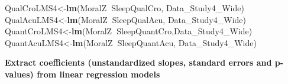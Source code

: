 \documentclass[
]{book}
\newenvironment{Shaded}{\begin{snugshade}}{\end{snugshade}}
\newcommand{\DataTypeTok}[1]{\textcolor[rgb]{0.13,0.29,0.53}{#1}}
\newcommand{\KeywordTok}[1]{\textcolor[rgb]{0.13,0.29,0.53}{\textbf{#1}}}
\newcommand{\NormalTok}[1]{#1}
\newcommand{\OperatorTok}[1]{\textcolor[rgb]{0.81,0.36,0.00}{\textbf{#1}}}
\newcommand{\OtherTok}[1]{\textcolor[rgb]{0.56,0.35,0.01}{#1}}
\newcommand{\StringTok}[1]{\textcolor[rgb]{0.31,0.60,0.02}{#1}}
\begin{document}
\begin{Shaded}
\end{Shaded}

\begin{Shaded}
\begin{Highlighting}[]
\NormalTok{QualCroLMS4<-}\KeywordTok{lm}\NormalTok{(MoralZ}\OperatorTok{~}\NormalTok{SleepQualCro, Data_Study4_Wide)}
\NormalTok{QualAcuLMS4<-}\KeywordTok{lm}\NormalTok{(MoralZ}\OperatorTok{~}\NormalTok{SleepQualAcu, Data_Study4_Wide)}
\NormalTok{QuantCroLMS4<-}\KeywordTok{lm}\NormalTok{(MoralZ}\OperatorTok{~}\NormalTok{SleepQuantCro,Data_Study4_Wide)}
\NormalTok{QuantAcuLMS4<-}\KeywordTok{lm}\NormalTok{(MoralZ}\OperatorTok{~}\NormalTok{SleepQuantAcu, Data_Study4_Wide)}
\end{Highlighting}
\end{Shaded}

\textbf{Extract coefficients (unstandardized slopes, standard errors and p-values) from linear regression models }
\end{document}
